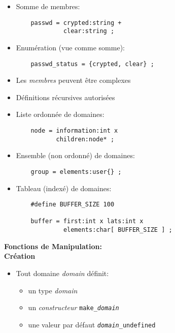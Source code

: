 \documentclass[11pt]{article}
\begin{document}
{\begin{itemize}
\begin{verbatim}
    user = name:string x id:int x 
           passwd x shell:string ;
\end{verbatim}
\item Somme de membres:

\begin{verbatim}
    passwd = crypted:string + 
             clear:string ;
\end{verbatim}
\item Enumération (vue comme somme):

\begin{verbatim}
    passwd_status = {crypted, clear} ;
\end{verbatim}
\end{itemize}

\newpage

\vskip 2cm

\begin{itemize}
\item Les {\em membres} peuvent être complexes
\item Définitions récursives autorisées
\item Liste ordonnée de domaines:

\begin{verbatim}
    node = information:int x 
           children:node* ;
\end{verbatim}
\item Ensemble (non ordonné) de domaines:

\begin{verbatim}
    group = elements:user{} ;
\end{verbatim}
\item Tableau (indexé) de domaines:

\begin{verbatim}
    #define BUFFER_SIZE 100

    buffer = first:int x lats:int x 
             elements:char[ BUFFER_SIZE ] ;
\end{verbatim}
\end{itemize}

\newpage

\begin{center}
{\huge\bf Fonctions de Manipulation: \\
Création}
\end{center}

\vskip 2cm

\begin{itemize}
\item Tout domaine {\em domain} définit:
        \begin{itemize}
        \item un type {\em domain}
        \item un {\em constructeur} {\tt make\_{\em domain}}
        \item une valeur par défaut {\tt {\em domain}\_undefined}
        \end{itemize}


\end{itemize}}
\end{document}
